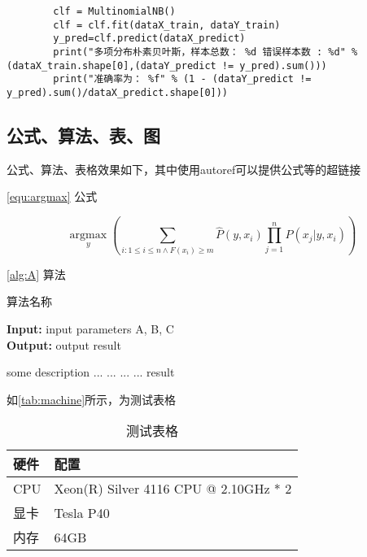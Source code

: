 \documentclass[UTF8,9pt]{ctexart}  %
\begin{document}
	
	\begin{verbatim}
		clf = MultinomialNB()
		clf = clf.fit(dataX_train, dataY_train)
		y_pred=clf.predict(dataX_predict)
		print("多项分布朴素贝叶斯，样本总数： %d 错误样本数 : %d" % (dataX_train.shape[0],(dataY_predict != y_pred).sum()))
		print("准确率为： %f" % (1 - (dataY_predict != y_pred).sum()/dataX_predict.shape[0]))
	\end{verbatim}



		\subsection{公式、算法、表、图}
		公式、算法、表格效果如下，其中使用autoref可以提供公式等的超链接
		
		\autoref{equ:argmax} 公式
		
		\begin{equation}
		\label{equ:argmax}
		\underset{y}{\operatorname{argmax}}\left(\sum_{i: 1 \leq i \leq n \wedge F\left(x_{i}\right) \geq m} \hat{P}\left(y, x_{i}\right) \prod_{j=1}^{n} \hat{P}\left(x_{j} | y, x_{i}\right)\right)
		\end{equation}
		
		\autoref{alg:A} 算法
		
		\begin{algorithm}[htb]
			\caption{算法名称} %
			\label{alg:A}
			\hspace*{0.02in} {\bf Input:} %
			input parameters A, B, C\\
			\hspace*{0.02in} {\bf Output:} %
			output result
			\begin{algorithmic}[1]
				\State some description %
				\State ...
				\State ...
				\Else
				\State ...
				\EndIf
				\EndFor
				\State ...
				\EndWhile
				\State \Return result
			\end{algorithmic}
		\end{algorithm}
	

		
		如\autoref{tab:machine}所示，为测试表格
		
		\begin{table}[htb]
			\centering
			\caption{测试表格 \label{tab:machine}}
			\begin{tabular}{l l}
				\hline
				硬件 & 配置 \\ \hline
				CPU & Xeon(R) Silver 4116 CPU @ 2.10GHz * 2 \\ 
				显卡 & Tesla P40 \\ 
				内存 & 64GB \\ \hline
			\end{tabular}
		\end{table}
		
\end{document}
